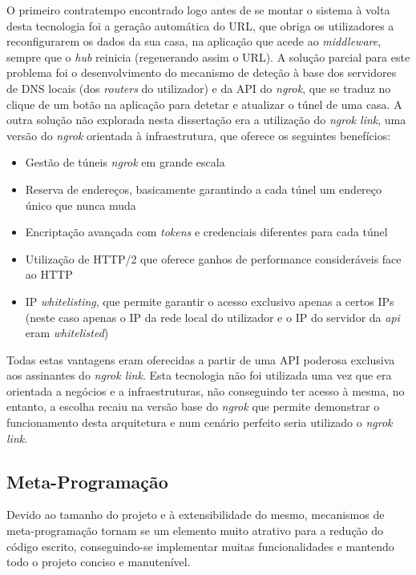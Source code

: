O primeiro contratempo encontrado logo antes de se montar o sistema à volta desta tecnologia foi a geração automática do URL, que obriga os utilizadores a reconfigurarem os dados da sua casa, na aplicação que acede ao \textit{middleware}, sempre que o \textit{hub} reinicia (regenerando assim o URL). A solução parcial para este problema foi o desenvolvimento do mecanismo de deteção à base dos servidores de DNS locais (dos \textit{routers} do utilizador) e da API do \textit{ngrok}, que se traduz no clique de um botão na aplicação para detetar e atualizar o túnel de uma casa. A outra solução não explorada nesta dissertação era a utilização do \textit{ngrok link}, uma versão do \textit{ngrok} orientada à infraestrutura, que oferece os seguintes benefícios:
\begin{itemize}
    \item Gestão de túneis \textit{ngrok} em grande escala
    \item Reserva de endereços, basicamente garantindo a cada túnel um endereço único que nunca muda
    \item Encriptação avançada com \textit{tokens} e credenciais diferentes para cada túnel
    \item Utilização de HTTP/2 que oferece ganhos de performance consideráveis face ao HTTP
    \item IP \textit{whitelisting}, que permite garantir o acesso exclusivo apenas a certos IPs (neste caso apenas o IP da rede local do utilizador e o IP do servidor da \textit{api} eram \textit{whitelisted})
\end{itemize}

Todas estas vantagens eram oferecidas a partir de uma API poderosa exclusiva aos assinantes do \textit{ngrok link}. Esta tecnologia não foi utilizada uma vez que era orientada a negócios e a infraestruturas, não conseguindo ter acesso à mesma, no entanto, a escolha recaiu na versão base do \textit{ngrok} que permite demonstrar o funcionamento desta arquitetura e num cenário perfeito seria utilizado o \textit{ngrok link}.

\subsection{Meta-Programação}

Devido ao tamanho do projeto e à extensibilidade do mesmo, mecanismos de meta-programação tornam se um elemento muito atrativo para a redução do código escrito, conseguindo-se implementar muitas funcionalidades e mantendo todo o projeto conciso e manutenível.

